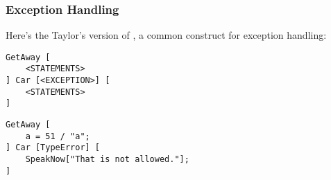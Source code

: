 \subsubsection{Exception Handling}

Here's the Taylor's version of , a common construct for exception handling:
\begin{verbatim}
GetAway [
    <STATEMENTS>
] Car [<EXCEPTION>] [
    <STATEMENTS>
]
\end{verbatim}
\begin{verbatim}
GetAway [
    a = 51 / "a";
] Car [TypeError] [
    SpeakNow["That is not allowed."];
]
\end{verbatim}